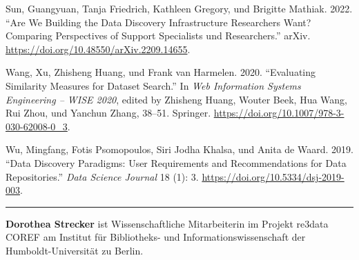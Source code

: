 \documentclass[a4paper,
fontsize=11pt,
oneside,
numbers=noperiodatend,
parskip=half-,
bibliography=totoc,
final
]{scrartcl}
\begin{document}
Sun, Guangyuan, Tanja Friedrich, Kathleen Gregory, und Brigitte Mathiak.
2022. \enquote{Are We Building the Data Discovery Infrastructure
Researchers Want? Comparing Perspectives of Support Specialists und
Researchers.} arXiv. \url{https://doi.org/10.48550/arXiv.2209.14655}.

Wang, Xu, Zhisheng Huang, und Frank van Harmelen. 2020.
\enquote{Evaluating Similarity Measures for Dataset Search.} In
\emph{Web Information Systems Engineering -- WISE 2020}, edited by
Zhisheng Huang, Wouter Beek, Hua Wang, Rui Zhou, und Yanchun Zhang,
38--51. Springer. \url{https://doi.org/10.1007/978-3-030-62008-0_3}.

Wu, Mingfang, Fotis Psomopoulos, Siri Jodha Khalsa, und Anita de Waard.
2019. \enquote{Data Discovery Paradigms: User Requirements and
Recommendations for Data Repositories.} \emph{Data Science Journal} 18
(1): 3. \url{https://doi.org/10.5334/dsj-2019-003}.

\begin{center}\rule{0.5\linewidth}{0.5pt}\end{center}

\textbf{Dorothea Strecker} ist Wissenschaftliche Mitarbeiterin im
Projekt re3data COREF am Institut für Bibliotheks- und
Informationswissenschaft der Humboldt-Universität zu Berlin.
\end{document}
